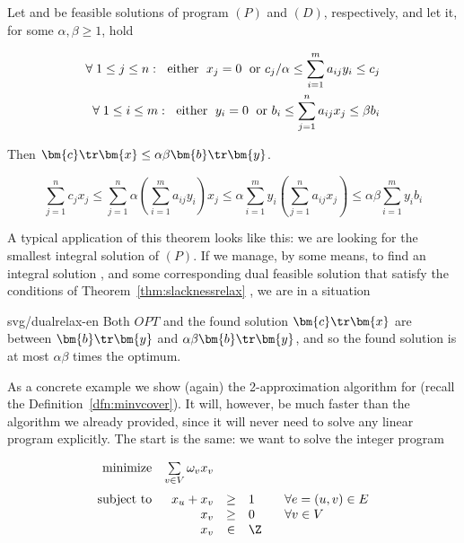 \begin{framed}
\begin{veta}
  \label{thm:slacknessrelax}
   Let  and  be feasible solutions of program $(P)$ and $(D)$, respectively, and let it, for some 
   $\alpha,\beta\ge1$, hold

\begin{eqnarray*}
  \forall\;1\le j\le n:\;{\rm\ either\ }\; x_j=0\; {\rm\ or\ }c_j/\alpha\le\sum_{i=1}^ma_{ij}y_i\le c_j\\
  \forall\;1\le i\le m:\;{\rm\ either\ }\; y_i=0\; {\rm\ or\ }b_i\le\sum_{j=1}^na_{ij}x_j\le\beta b_i
\end{eqnarray*}

\noindent
Then $\bm{c}\tr\bm{x}\le\alpha\beta\bm{b}\tr\bm{y}$.
\end{veta}
\end{framed}

\begin{dokaz}
  $$\sum_{j=1}^nc_jx_j\le\sum_{j=1}^n\alpha\left(\sum_{i=1}^ma_{ij}y_i\right)x_j
  \le\alpha\sum_{i=1}^my_i\left(\sum_{j=1}^na_{ij}x_j\right)\le\alpha\beta\sum_{i=1}^my_ib_i
  $$
\end{dokaz}

\noindent
A typical application of this theorem looks like this: we are looking for the smallest integral solution of
$(P)$. If we manage, by some means, to find an integral solution , and some corresponding dual
feasible solution  that satisfy the conditions of Theorem~\ref{thm:slacknessrelax} , we are in a situation

\begin{myfig}{\textwidth}{svg/dualrelax-en}
  Both $OPT$ and the found solution $\bm{c}\tr\bm{x}$ are between $\bm{b}\tr\bm{y}$
  and $\alpha\beta\bm{b}\tr\bm{y}$, and so the found solution is at most $\alpha\beta$ times
  the optimum.
\end{myfig}

\noindent
As a concrete example we show (again) the 2-approximation algorithm for \minvcover (recall the
Definition~\ref{dfn:minvcover}). It will, however, be much faster than the algorithm we already provided,
since it will never need to solve any linear program explicitly. The start is the same: we want to 
solve the integer program


\edef\tmp{\theequation}

\addtocounter{equation}{-1}


\begin{equation}
\begin{array}{rrcll}
  {\rm minimize}     & \multicolumn{1}{l}{\sum\limits_{v\in V}\omega_vx_v}\\[3ex]
  {\rm subject\ to} & x_u + x_v&\ge&1& \;\;\;\forall e=(u,v)\in E\\
                          & x_v&\ge&0& \;\;\;\forall v\in V\\
                          & x_v&\in&\Z
\end{array}
\end{equation}

